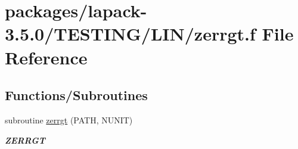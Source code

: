 \hypertarget{zerrgt_8f}{}\section{packages/lapack-\/3.5.0/\+T\+E\+S\+T\+I\+N\+G/\+L\+I\+N/zerrgt.f File Reference}
\label{zerrgt_8f}
\subsection*{Functions/\+Subroutines}
\begin{DoxyCompactItemize}
\item 
subroutine \hyperlink{group__complex16__lin_ga0fdeafb50cbcccdea9de662332c04fa4}{zerrgt} (P\+A\+T\+H, N\+U\+N\+I\+T)
\begin{DoxyCompactList}\small\item\em {\bfseries Z\+E\+R\+R\+G\+T} \end{DoxyCompactList}\end{DoxyCompactItemize}
